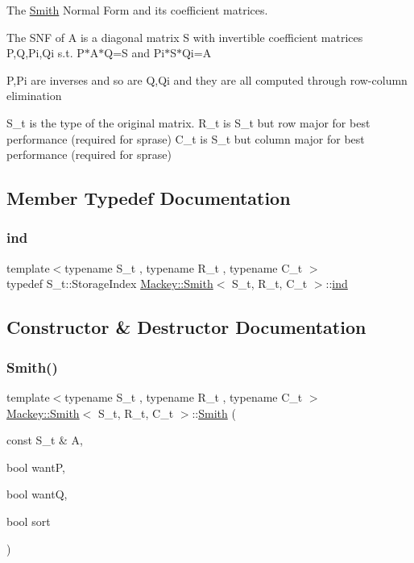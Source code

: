 The \hyperlink{classMackey_1_1Smith}{Smith} Normal Form and its coefficient matrices. 

The S\+NF of A is a diagonal matrix S with invertible coefficient matrices P,Q,Pi,Qi s.\+t. P$\ast$\+A$\ast$Q=S and Pi$\ast$\+S$\ast$\+Qi=A

P,Pi are inverses and so are Q,Qi and they are all computed through row-\/column elimination

S\+\_\+t is the type of the original matrix. R\+\_\+t is S\+\_\+t but row major for best performance (required for sprase) C\+\_\+t is S\+\_\+t but column major for best performance (required for sprase) 

\subsection{Member Typedef Documentation}
\mbox{\label{classMackey_1_1Smith_acf2eec378d950576afd70dc941cad0c4}} 
\subsubsection{\texorpdfstring{ind}{ind}}
{\footnotesize\ttfamily template$<$typename S\+\_\+t , typename R\+\_\+t , typename C\+\_\+t $>$ \\
typedef S\+\_\+t\+::\+Storage\+Index \hyperlink{classMackey_1_1Smith}{Mackey\+::\+Smith}$<$ S\+\_\+t, R\+\_\+t, C\+\_\+t $>$\+::\hyperlink{classMackey_1_1Smith_acf2eec378d950576afd70dc941cad0c4}{ind}\hspace{0.3cm}{\ttfamily [protected]}}



\subsection{Constructor \& Destructor Documentation}
\mbox{\label{classMackey_1_1Smith_ab366b0cccb7fe065521142c442a0dcd3}} 
\subsubsection{\texorpdfstring{Smith()}{Smith()}}
{\footnotesize\ttfamily template$<$typename S\+\_\+t , typename R\+\_\+t , typename C\+\_\+t $>$ \\
\hyperlink{classMackey_1_1Smith}{Mackey\+::\+Smith}$<$ S\+\_\+t, R\+\_\+t, C\+\_\+t $>$\+::\hyperlink{classMackey_1_1Smith}{Smith} (\begin{DoxyParamCaption}\item[{const S\+\_\+t \&}]{A,  }\item[{bool}]{wantP,  }\item[{bool}]{wantQ,  }\item[{bool}]{sort }\end{DoxyParamCaption})\hspace{0.3cm}{\ttfamily [protected]}}




